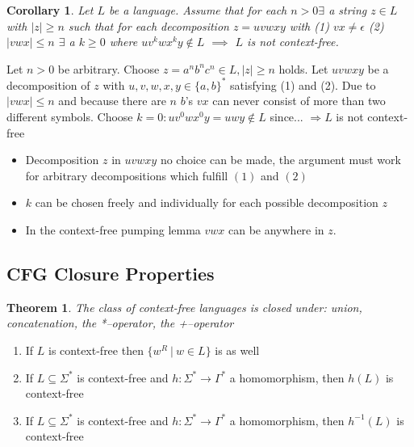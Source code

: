 \documentclass[a3paper, 8pt]{extarticle}
\newtheorem{theorem}{Theorem}[section]
\newtheorem{corollary}{Corollary}[theorem]
\begin{document}
\begin{multicols*}{6}
\begin{corollary}
Let $L$ be a language. Assume that for each $n > 0 \exists$ a string $z \in L$ with $|z| \geq n$ such that for each decomposition $z=uvwxy$ with (1) $vx \neq \epsilon$ (2) $|vwx|\leq n$
$\exists$ a $k \geq 0$ where $uv^kwx^ky \notin L$ $\implies$ $L$ is not context-free.
\end{corollary}
 Let $n>0$ be arbitrary. Choose $z=a^nb^nc^n \in L, |z|\geq n$ holds. Let $uvwxy$ be a decomposition of $z$ with $u,v,w,x,y \in \{a,b\}^*$ satisfying (1) and (2). Due to $|vwx|\leq n$ and because there are $n$ $b$'s $vx$ can never consist of more than two different symbols. Choose $k=0: uv^0wx^0y=uwy \notin L$ since... $\Rightarrow L$ is not context-free
\begin{itemize}
    \item Decomposition $z$ in $uvwxy$ no choice can be made, the argument must work for arbitrary decompositions which fulfill $(1)$ and $(2)$
    \item $k$ can be chosen freely and individually for each possible decomposition $z$
    \item In the context-free pumping lemma $vwx$ can be anywhere in $z.$
\end{itemize}

\subsection{CFG Closure Properties}
\begin{theorem}
The class of context-free languages is closed under:  union, concatenation, the *–operator, the +–operator
\end{theorem}


\begin{enumerate}
    \item If $L$ is context-free then $\{w^R\: | \: w \in L \}$ is as well
    \item If $L \subseteq \Sigma^*$ is context-free and $h: \Sigma^* \to \Gamma^*$ a homomorphism, then $h(L)$ is context-free
    \item If $L \subseteq \Sigma^*$ is context-free and $h: \Sigma^* \to \Gamma^*$ a homomorphism, then $h^{-1}(L)$ is context-free 
\end{enumerate}


\end{multicols*}
\end{document}
